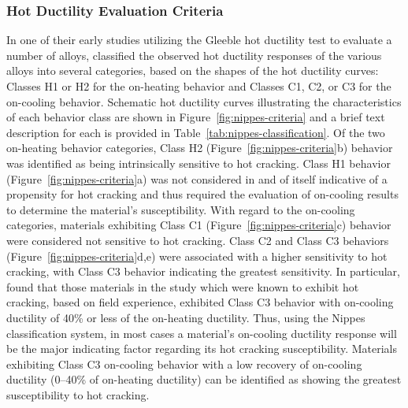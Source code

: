 \subsubsection{Hot Ductility Evaluation Criteria}
In one of their early studies utilizing the Gleeble hot ductility test to evaluate a number of alloys, \citet{nippes_further_1957} classified the observed hot ductility responses of the various alloys into several categories, based on the shapes of the hot ductility curves: Classes H1 or H2 for the on-heating behavior and Classes C1, C2, or C3 for the on-cooling behavior. Schematic hot ductility curves illustrating the characteristics of each behavior class are shown in Figure~\ref{fig:nippes-criteria} and a brief text description for each is provided in Table~\ref{tab:nippes-classification}. Of the two on-heating behavior categories, Class H2 (Figure~\ref{fig:nippes-criteria}b) behavior was identified as being intrinsically sensitive to hot cracking. Class H1 behavior (Figure~\ref{fig:nippes-criteria}a) was not considered in and of itself indicative of a propensity for hot cracking and thus required the evaluation of on-cooling results to determine the material's susceptibility. With regard to the on-cooling categories, materials exhibiting Class C1 (Figure~\ref{fig:nippes-criteria}c) behavior were considered not sensitive to hot cracking. Class C2 and Class C3 behaviors (Figure~\ref{fig:nippes-criteria}d,e) were associated with a higher sensitivity to hot cracking, with Class C3 behavior indicating the greatest sensitivity. In particular, \citeauthor{nippes_further_1957} found that those materials in the study which were known to exhibit hot cracking, based on field experience, exhibited Class C3 behavior with on-cooling ductility of 40\% or less of the on-heating ductility. Thus, using the Nippes classification system, in most cases a material's on-cooling ductility response will be the major indicating factor regarding its hot cracking susceptibility. Materials exhibiting Class C3 on-cooling behavior with a low recovery of on-cooling ductility (0--40\% of on-heating ductility) can be identified as showing the greatest susceptibility to hot cracking.

